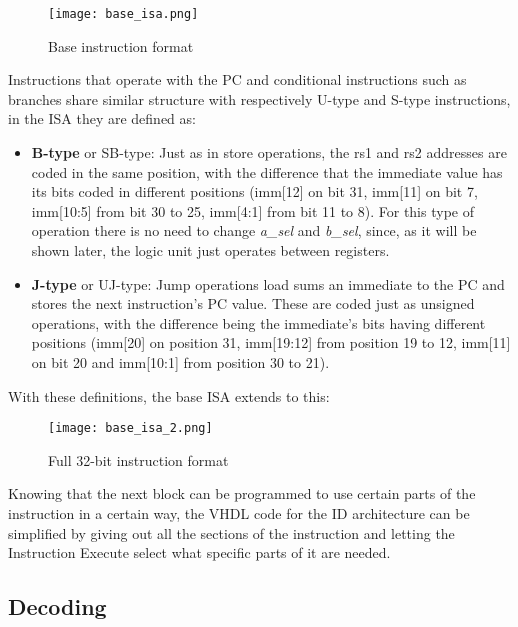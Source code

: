 \begin{figure}[h!]
  \centering
  \texttt{[image: base\_isa.png]}
  \caption{Base instruction format \cite{waterman2016riscv}}
  \label{fig:base_form}
\end{figure}
Instructions that operate with the PC and conditional instructions such as branches share similar structure with respectively U-type and S-type instructions, in the ISA they are defined as:
\begin{itemize}
  \item \textbf{B-type} or SB-type: Just as in store operations, the rs1 and rs2 addresses are coded in the same position, with the difference that the immediate value has its bits coded in different positions (imm[12] on bit 31, imm[11] on bit 7, imm[10:5] from bit 30 to 25, imm[4:1] from bit 11 to 8). For this type of operation there is no need to change \emph{a\_sel} and \emph{b\_sel}, since, as it will be shown later, the logic unit just operates between registers.
  \item \textbf{J-type} or UJ-type: Jump operations load sums an immediate to the PC and stores the next instruction's PC value. These are coded just as unsigned operations, with the difference being the immediate's bits having different positions (imm[20] on position 31, imm[19:12] from position 19 to 12, imm[11] on bit 20 and imm[10:1] from position 30 to 21).
\end{itemize}
With these definitions, the base ISA extends to this:

\begin{figure}[ht]
  \centering
  \texttt{[image: base\_isa\_2.png]}
  \caption{Full 32-bit instruction format \cite{waterman2016riscv}}
  \label{fig:full_form}
\end{figure}
Knowing that the next block can be programmed to use certain parts of the instruction in a certain way, the VHDL code for the ID architecture can be simplified by giving out all the sections of the instruction and letting the Instruction Execute select what specific parts of it are needed.

\subsection{Decoding}

